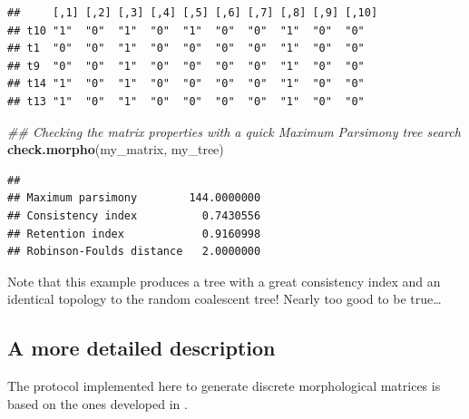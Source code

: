 \documentclass[
]{book}
\newenvironment{Shaded}{\begin{snugshade}}{\end{snugshade}}
\newcommand{\CommentTok}[1]{\textcolor[rgb]{0.56,0.35,0.01}{\textit{#1}}}
\newcommand{\KeywordTok}[1]{\textcolor[rgb]{0.13,0.29,0.53}{\textbf{#1}}}
\newcommand{\NormalTok}[1]{#1}
\begin{document}
\begin{verbatim}
##     [,1] [,2] [,3] [,4] [,5] [,6] [,7] [,8] [,9] [,10]
## t10 "1"  "0"  "1"  "0"  "1"  "0"  "0"  "1"  "0"  "0"  
## t1  "0"  "0"  "1"  "0"  "0"  "0"  "0"  "1"  "0"  "0"  
## t9  "0"  "0"  "1"  "0"  "0"  "0"  "0"  "1"  "0"  "0"  
## t14 "1"  "0"  "1"  "0"  "0"  "0"  "0"  "1"  "0"  "0"  
## t13 "1"  "0"  "1"  "0"  "0"  "0"  "0"  "1"  "0"  "0"
\end{verbatim}

\begin{Shaded}
\begin{Highlighting}[]
\CommentTok{\#\# Checking the matrix properties with a quick Maximum Parsimony tree search}
\KeywordTok{check.morpho}\NormalTok{(my\_matrix, my\_tree)}
\end{Highlighting}
\end{Shaded}

\begin{verbatim}
##                                     
## Maximum parsimony        144.0000000
## Consistency index          0.7430556
## Retention index            0.9160998
## Robinson-Foulds distance   2.0000000
\end{verbatim}

Note that this example produces a tree with a great consistency index and an identical topology to the random coalescent tree!
Nearly too good to be true\ldots{}

\hypertarget{a-more-detailed-description}{%
\subsection{A more detailed description}\label{a-more-detailed-description}}

The protocol implemented here to generate discrete morphological matrices is based on the ones developed in \citep{GuillermeCooper, OReilly2016, puttick2017uncertain, OReilly2017}.
\end{document}
